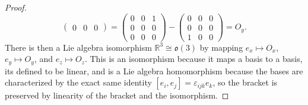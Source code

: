 \documentclass[11pt, letterpaper]{article}
\begin{document}
\begin{proof}
\[\begin{pmatrix}
		0 & 0 & 0
		\end{pmatrix}=\begin{pmatrix}
		0 & 0 & 1 \\
		0 & 0 & 0 \\
		0 & 0 & 0
		\end{pmatrix}-\begin{pmatrix}
		0 & 0 & 0 \\
		0 & 0 & 0 \\
		1 & 0 & 0
		\end{pmatrix}=O_y
	.\]
	There is then a Lie algebra isomorphism $\mathbb{R} ^3 \cong \mathfrak{o} (3)$ by mapping $e_x\mapsto O_x$, $e_y\mapsto O_y$, and $e_z\mapsto O_z$. This is an isomorphism because it maps a basis to a basis, its defined to be linear, and is a Lie algebra homomorphism because the bases are characterized by the exact same identity $[e_i,e_j]=\varepsilon _{ijk} e_k$, so the bracket is preserved by linearity of the bracket and the isomorphism.


\end{proof}
\end{document}
